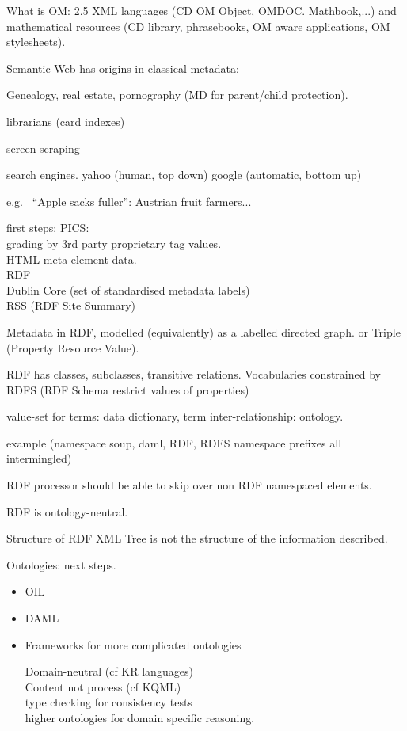 \documentclass[11pt, a4paper]{article}
\begin{document}
What is OM:
2.5 XML languages (CD OM Object, OMDOC. Mathbook,...) and
mathematical resources (CD library, phrasebooks, OM aware applications, OM stylesheets).

Semantic Web has origins in classical metadata:

Genealogy, real estate, pornography (MD for parent/child protection).

librarians (card indexes)

screen scraping

search engines.
yahoo (human, top down) google (automatic, bottom up)

e.g.~ ``Apple sacks fuller'': Austrian fruit farmers...

first steps: PICS:\\
grading by 3rd party proprietary tag values.\\
HTML meta element data.\\
RDF\\
Dublin Core (set of standardised metadata labels)\\
RSS (RDF Site Summary)


Metadata in RDF, modelled (equivalently) as a 
labelled directed graph. or  Triple (Property Resource Value).


RDF has classes, subclasses, transitive relations.
Vocabularies constrained by RDFS (RDF Schema restrict values of
properties)

value-set for terms: data dictionary, term inter-relationship: ontology.

example (namespace soup, daml, RDF, RDFS namespace prefixes all intermingled)

RDF processor should be able to skip over non RDF namespaced elements.

RDF is ontology-neutral.

Structure of RDF XML Tree is not the structure of the information described.

Ontologies: next steps.
\begin{itemize}
\item OIL
\item DAML
\item Frameworks for more complicated ontologies

Domain-neutral (cf KR languages)\\
Content not process (cf KQML)\\
type checking for consistency tests\\
higher ontologies for domain specific reasoning.

\end{itemize}
\end{document}
